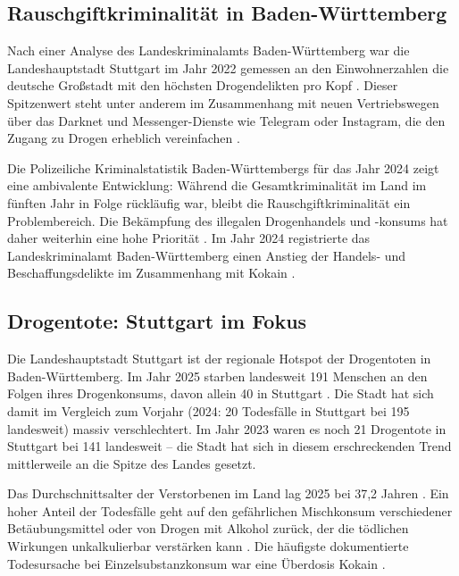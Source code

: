 \documentclass[11pt,a4paper]{article}
\begin{document}
	\subsection{Rauschgiftkriminalität in Baden-Württemberg}
	
	Nach einer Analyse des Landeskriminalamts Baden-Württemberg war die Landeshauptstadt Stuttgart im Jahr 2022 gemessen an den Einwohnerzahlen die deutsche Großstadt mit den höchsten Drogendelikten pro Kopf \cite{stuttgart-drug-delikte}. Dieser Spitzenwert steht unter anderem im Zusammenhang mit neuen Vertriebswegen über das Darknet und Messenger-Dienste wie Telegram oder Instagram, die den Zugang zu Drogen erheblich vereinfachen \cite{stuttgart-drug-delikte}.
	
	Die Polizeiliche Kriminalstatistik Baden-Württembergs für das Jahr 2024 zeigt eine ambivalente Entwicklung: Während die Gesamtkriminalität im Land im fünften Jahr in Folge rückläufig war, bleibt die Rauschgiftkriminalität ein Problembereich. Die Bekämpfung des illegalen Drogenhandels und -konsums hat daher weiterhin eine hohe Priorität \cite{sicherheitsbericht-2025}. Im Jahr 2024 registrierte das Landeskriminalamt Baden-Württemberg einen Anstieg der Handels- und Beschaffungsdelikte im Zusammenhang mit Kokain \cite{stuttgart-drug-delikte}.
	
	\subsection{Drogentote: Stuttgart im Fokus}
	
	Die Landeshauptstadt Stuttgart ist der regionale Hotspot der Drogentoten in Baden-Württemberg. Im Jahr 2025 starben landesweit 191 Menschen an den Folgen ihres Drogenkonsums, davon allein 40 in Stuttgart \cite{drogentote-2025}. Die Stadt hat sich damit im Vergleich zum Vorjahr (2024: 20 Todesfälle in Stuttgart bei 195 landesweit) massiv verschlechtert. Im Jahr 2023 waren es noch 21 Drogentote in Stuttgart bei 141 landesweit \cite{drogentote-2023} – die Stadt hat sich in diesem erschreckenden Trend mittlerweile an die Spitze des Landes gesetzt.
	
	Das Durchschnittsalter der Verstorbenen im Land lag 2025 bei 37,2 Jahren \cite{drogentote-2025}. Ein hoher Anteil der Todesfälle geht auf den gefährlichen Mischkonsum verschiedener Betäubungsmittel oder von Drogen mit Alkohol zurück, der die tödlichen Wirkungen unkalkulierbar verstärken kann \cite{drogentote-2025}. Die häufigste dokumentierte Todesursache bei Einzelsubstanzkonsum war eine Überdosis Kokain \cite{drogentote-2025}.
	
\end{document}
